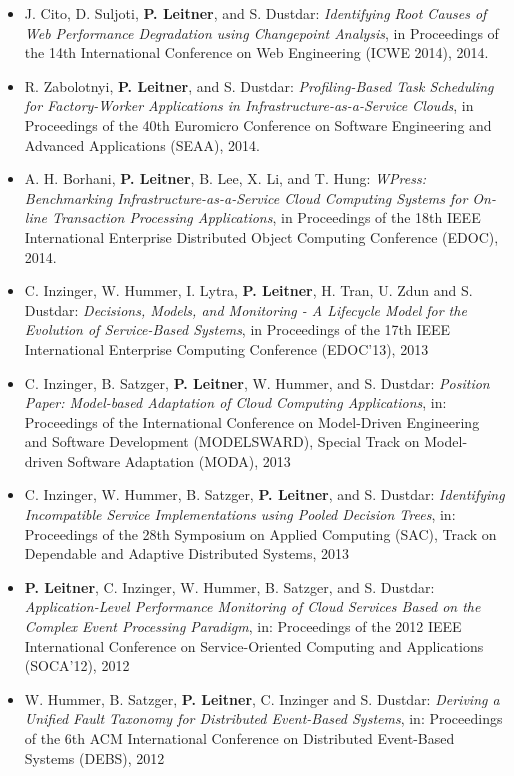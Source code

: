 \documentclass[paper=letter,fontsize=11pt]{scrartcl} %
\begin{document}
\begin{itemize}
  \item J. Cito, D. Suljoti, \textbf{P. Leitner}, and S. Dustdar: \emph{Identifying Root Causes of Web Performance Degradation using Changepoint Analysis}, in Proceedings of the 14th International Conference on Web Engineering (ICWE 2014), 2014.
 \item R. Zabolotnyi, \textbf{P. Leitner}, and S. Dustdar: \emph{Profiling-Based Task Scheduling for Factory-Worker Applications in Infrastructure-as-a-Service Clouds}, in Proceedings of the 40th Euromicro Conference on Software Engineering and Advanced Applications (SEAA), 2014.
 \item A. H. Borhani, \textbf{P. Leitner}, B. Lee, X. Li, and T. Hung: \emph{WPress: Benchmarking Infrastructure-as-a-Service Cloud Computing Systems for On-line Transaction Processing Applications}, in Proceedings of the 18th IEEE International Enterprise Distributed Object Computing Conference (EDOC), 2014.
\item C. Inzinger, W. Hummer, I. Lytra, \textbf{P. Leitner}, H. Tran, U. Zdun and S. Dustdar: \emph{Decisions, Models, and Monitoring - A Lifecycle Model for the Evolution of Service-Based Systems}, in Proceedings of the 17th IEEE International Enterprise Computing Conference (EDOC'13), 2013
\item C. Inzinger, B. Satzger, \textbf{P. Leitner}, W. Hummer, and S. Dustdar:
\emph{Position Paper: Model-based Adaptation of Cloud Computing Applications},  in: Proceedings of the International Conference on Model-Driven Engineering and Software Development (MODELSWARD), Special Track on Model-driven Software Adaptation (MODA), 2013
\item C. Inzinger, W. Hummer, B. Satzger, \textbf{P. Leitner}, and S. Dustdar:
\emph{Identifying Incompatible Service Implementations using Pooled Decision Trees},  in: Proceedings of the 28th Symposium on Applied Computing (SAC), Track on Dependable and Adaptive Distributed Systems, 2013
\item \textbf{P. Leitner}, C. Inzinger, W. Hummer, B. Satzger, and S. Dustdar:
\emph{Application-Level Performance Monitoring of Cloud Services Based on the Complex Event Processing Paradigm}, in: Proceedings of the 2012 IEEE International Conference on Service-Oriented Computing and Applications (SOCA'12), 2012
\item W. Hummer, B. Satzger, \textbf{P. Leitner}, C. Inzinger and S. Dustdar:
\emph{Deriving a Unified Fault Taxonomy for Distributed Event-Based Systems}, in: Proceedings of the 6th ACM International Conference on Distributed Event-Based Systems (DEBS), 2012

\end{itemize}
\end{document}
